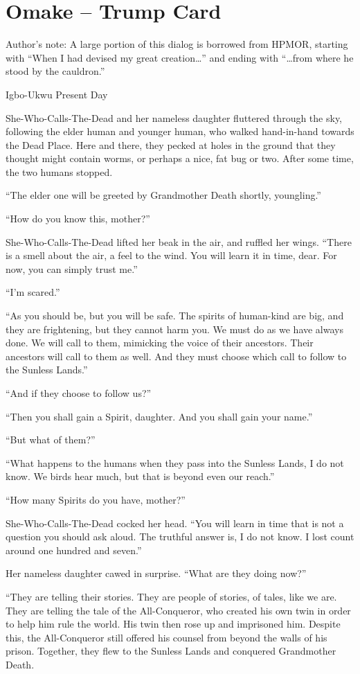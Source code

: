 \section{Omake – Trump Card}

Author’s note:
A large portion of this dialog is borrowed from HPMOR, starting with “When I had devised my great creation…” and ending with “…from where he stood by the cauldron.”

Igbo-Ukwu 
Present Day

She-Who-Calls-The-Dead and her nameless daughter fluttered through the sky, following the elder human and younger human, who walked hand-in-hand towards the Dead Place. Here and there, they pecked at holes in the ground that they thought might contain worms, or perhaps a nice, fat bug or two. After some time, the two humans stopped.

“The elder one will be greeted by Grandmother Death shortly, youngling.”

“How do you know this, mother?”

She-Who-Calls-The-Dead lifted her beak in the air, and ruffled her wings. “There is a smell about the air, a feel to the wind. You will learn it in time, dear. For now, you can simply trust me.”

“I’m scared.”

“As you should be, but you will be safe. The spirits of human-kind are big, and they are frightening, but they cannot harm you. We must do as we have always done. We will call to them, mimicking the voice of their ancestors. Their ancestors will call to them as well. And they must choose which call to follow to the Sunless Lands.”

“And if they choose to follow us?”

“Then you shall gain a Spirit, daughter. And you shall gain your name.”

“But what of them?”

“What happens to the humans when they pass into the Sunless Lands, I do not know. We birds hear much, but that is beyond even our reach.”

“How many Spirits do you have, mother?”

She-Who-Calls-The-Dead cocked her head. “You will learn in time that is not a question you should ask aloud. The truthful answer is, I do not know. I lost count around one hundred and seven.”

Her nameless daughter cawed in surprise. “What are they doing now?”

“They are telling their stories. They are people of stories, of tales, like we are. They are telling the tale of the All-Conqueror, who created his own twin in order to help him rule the world. His twin then rose up and imprisoned him. Despite this, the All-Conqueror still offered his counsel from beyond the walls of his prison. Together, they flew to the Sunless Lands and conquered Grandmother Death.

